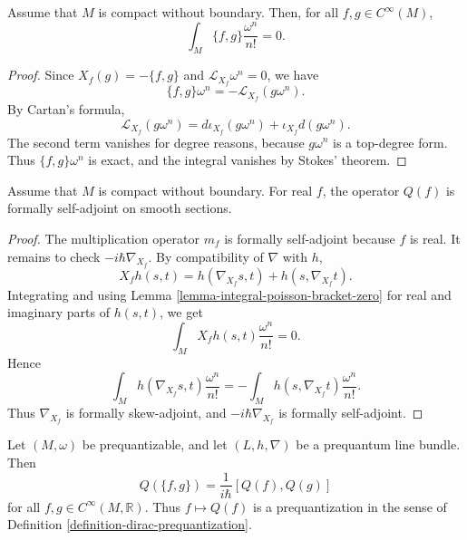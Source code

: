 \begin{lemma}
\label{lemma-integral-poisson-bracket-zero}
Assume that $M$ is compact without boundary.
Then, for all $f,g\in C^\infty(M)$,
$$
\int_M \{f,g\}\frac{\omega^n}{n!}=0.
$$
\end{lemma}

\begin{proof}
Since $X_f(g)=-\{f,g\}$ and
$\mathcal L_{X_f}\omega^n=0$, we have
$$
\{f,g\}\omega^n
=-\mathcal L_{X_f}(g\omega^n).
$$
By Cartan's formula,
$$
\mathcal L_{X_f}(g\omega^n)
=d\iota_{X_f}(g\omega^n)+
\iota_{X_f}d(g\omega^n).
$$
The second term vanishes for degree reasons,
because $g\omega^n$ is a top-degree form.
Thus $\{f,g\}\omega^n$ is exact, and the
integral vanishes by Stokes' theorem.
\end{proof}

\begin{proposition}
\label{proposition-prequantum-self-adjoint}
Assume that $M$ is compact without boundary.
For real $f$, the operator $Q(f)$ is formally
self-adjoint on smooth sections.
\end{proposition}

\begin{proof}
The multiplication operator $m_f$ is formally
self-adjoint because $f$ is real.  It remains
to check $-i\hbar\nabla_{X_f}$.
By compatibility of $\nabla$ with $h$,
$$
X_fh(s,t)=h(\nabla_{X_f}s,t)
+h(s,\nabla_{X_f}t).
$$
Integrating and using Lemma
\ref{lemma-integral-poisson-bracket-zero} for
real and imaginary parts of $h(s,t)$, we get
$$
\int_M X_fh(s,t)\frac{\omega^n}{n!}=0.
$$
Hence
$$
\int_M h(\nabla_{X_f}s,t)\frac{\omega^n}{n!}
=-
\int_M h(s,\nabla_{X_f}t)\frac{\omega^n}{n!}.
$$
Thus $\nabla_{X_f}$ is formally skew-adjoint,
and $-i\hbar\nabla_{X_f}$ is formally
self-adjoint.
\end{proof}

\begin{theorem}
\label{theorem-kostant-souriau}
\begin{reference}
\cite[Propositions 23.13--23.14]{hallq}
\end{reference}
Let $(M,\omega)$ be prequantizable, and let
$(L,h,\nabla)$ be a prequantum line bundle.
Then
$$
Q(\{f,g\})=\frac{1}{i\hbar}[Q(f),Q(g)]
$$
for all $f,g\in C^\infty(M,\mathbb{R})$.
Thus $f\mapsto Q(f)$ is a prequantization in
the sense of Definition
\ref{definition-dirac-prequantization}.
\end{theorem}

